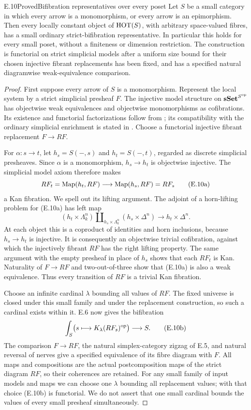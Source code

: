 \begin{statement}{E.10}{Proved}{Bifibration representatives over every poset}
Let $S$ be a small category in which every arrow is a monomorphism, or
every arrow is an epimorphism. Then every locally constant object of
$\mathrm{HOT}(S)$, with arbitrary space-valued fibres, has a small ordinary
strict-bifibration representative. In particular this holds for every
small poset, without a finiteness or dimension restriction. The
construction is functorial on strict simplicial models after a uniform
size bound for their chosen injective fibrant replacements has been
fixed, and has a specified natural diagramwise weak-equivalence
comparison.
\end{statement}
\begin{proof}
First suppose every arrow of $S$ is a monomorphism. Represent the local
system by a strict simplicial presheaf $F$. The injective model
structure on $\mathbf{sSet}^{S^{\mathrm{op}}}$ has objectwise weak equivalences
and objectwise monomorphisms as cofibrations. Its existence and
functorial factorizations follow from
\citet[Proposition A.2.8.2]{FLurieHTT2009}; its compatibility with the
ordinary simplicial enrichment is stated in
\citet[Proposition A.3.3.2 and Remark A.3.3.4]{FLurieHTT2009}.
Choose a functorial injective fibrant replacement $F\to RF$.

For $\alpha:s\to t$, let $h_s=S(-,s)$ and $h_t=S(-,t)$, regarded as
discrete simplicial presheaves. Since $\alpha$ is a monomorphism,
$h_s\to h_t$ is objectwise injective. The simplicial model axiom
therefore makes
\[
 RF_t=\operatorname{Map}(h_t,RF)\longrightarrow\operatorname{Map}(h_s,RF)=RF_s
\tag{E.10a}
\]
a Kan fibration. We spell out its lifting argument. The adjoint of a
horn-lifting problem for (E.10a) has left map
\[
 (h_t\times\Lambda^n_k)\amalg_{h_s\times\Lambda^n_k}
       (h_s\times\Delta^n)
       \longrightarrow h_t\times\Delta^n .
\]
At each object this is a coproduct of identities and horn inclusions,
because $h_s\to h_t$ is injective. It is consequently an objectwise
trivial cofibration, against which the injectively fibrant $RF$ has the
right lifting property. The same argument with the empty presheaf
in place of $h_s$ shows that each $RF_t$ is Kan. Naturality of
$F\to RF$ and two-out-of-three show that (E.10a) is also a weak
equivalence. Thus every transition of $RF$ is a trivial Kan fibration.

Choose an infinite cardinal $\lambda$ bounding all values of $RF$.
The fixed universe is closed under this small family and under the
replacement construction, so such a cardinal exists within it.
E.6 now gives the bifibration
\[
 \int_S\bigl(s\longmapsto K_\lambda(RF_s)^{\mathrm{op}}\bigr)\longrightarrow S.
\tag{E.10b}
\]
The comparison $F\to RF$, the natural simplex-category zigzag of E.5,
and natural reversal of nerves give a specified equivalence of its
fibre diagram with $F$. All maps and compositions are the actual
postcomposition maps of the strict diagram $RF$, so their coherences
are retained. For any small family of input models and maps we can
choose one $\lambda$ bounding all replacement values; with that
choice (E.10b) is functorial. We do not assert that one small cardinal
bounds the values of every small presheaf simultaneously.


\end{proof}
